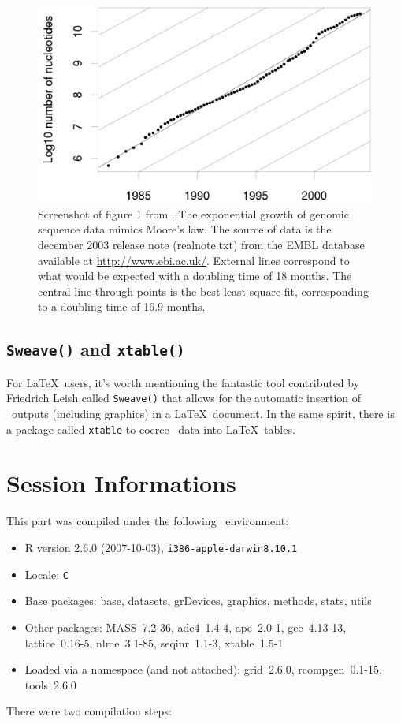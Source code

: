 \documentclass{article}
\begin{document}
\begin{figure}
\begin{center}
\includegraphics[width=\textwidth]{../figs/fig1lncs2004}
\end{center}
\caption{Screenshot of figure 1 from \cite{lobrylncs}.
The exponential growth of genomic sequence data mimics Moore's law.
The source of data is the december 2003 release note (realnote.txt) from the EMBL database
available at \protect\url{http://www.ebi.ac.uk/}. External lines correspond to what would be expected with
a doubling time of 18 months. The central line through points is the best least square fit,
corresponding to a doubling time of 16.9 months.}
\label{fig1lncs2004}
\end{figure}

\subsection{\texttt{Sweave()} and \texttt{xtable()}}

For \LaTeX~users, it's
worth mentioning the fantastic tool contributed by Friedrich Leish \cite{Sweave}
called \texttt{Sweave()} that allows for the automatic insertion
of \Rlogo{}~outputs (including graphics) in a \LaTeX~document. In the same spirit, there
is a package called \texttt{xtable} \cite{xtable} to coerce \Rlogo{}~data into \LaTeX~tables.


\section*{Session Informations}

This part was compiled under the following \Rlogo{}~environment:

\begin{itemize}
  \item R version 2.6.0 (2007-10-03), \verb|i386-apple-darwin8.10.1|
  \item Locale: \verb|C|
  \item Base packages: base, datasets, grDevices, graphics, methods,
    stats, utils
  \item Other packages: MASS~7.2-36, ade4~1.4-4, ape~2.0-1,
    gee~4.13-13, lattice~0.16-5, nlme~3.1-85, seqinr~1.1-3,
    xtable~1.5-1
  \item Loaded via a namespace (and not attached): grid~2.6.0,
    rcompgen~0.1-15, tools~2.6.0
\end{itemize}
There were two compilation steps:
\end{document}
